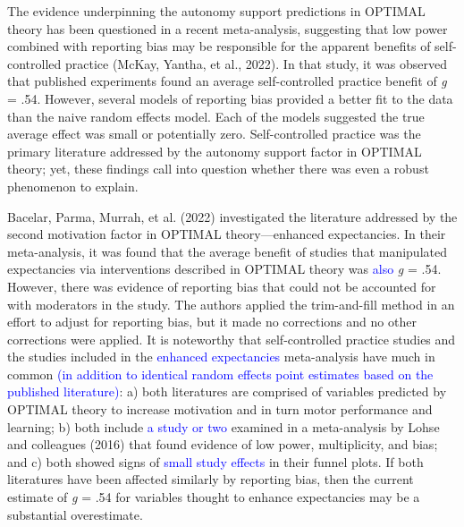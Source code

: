 \documentclass[
  man, donotrepeattitle,mask,floatsintext]{apa7}
\begin{document}
The evidence underpinning the autonomy support predictions in OPTIMAL theory has been questioned in a recent meta-analysis, suggesting that low power combined with reporting bias may be responsible for the apparent benefits of self-controlled practice (McKay, Yantha, et al., 2022). In that study, it was observed that published experiments found an average self-controlled practice benefit of \emph{g} = .54. However, several models of reporting bias provided a better fit to the data than the naive random effects model. Each of the models suggested the true average effect was small or potentially zero. Self-controlled practice was the primary literature addressed by the autonomy support factor in OPTIMAL theory; yet, these findings call into question whether there was even a robust phenomenon to explain.

Bacelar, Parma, Murrah, et al. (2022) investigated the literature addressed by the second motivation factor in OPTIMAL theory---enhanced expectancies. In their meta-analysis, it was found that the average benefit of studies that manipulated expectancies via interventions described in OPTIMAL theory was \textcolor{blue}{also} \emph{g} = .54. However, there was evidence of reporting bias that could not be accounted for with moderators in the study. The authors applied the trim-and-fill method in an effort to adjust for reporting bias, but it made no corrections and no other corrections were applied. It is noteworthy that self-controlled practice studies and the studies included in the \textcolor{blue}{enhanced expectancies} meta-analysis have much in common \textcolor{blue}{(in addition to identical random effects point estimates based on the published literature)}: a) both literatures are comprised of variables predicted by OPTIMAL theory to increase motivation and in turn motor performance and learning; b) both include \textcolor{blue}{a study or two} examined in a meta-analysis by Lohse and colleagues (2016) that found evidence of low power, multiplicity, and bias; and c) both showed signs of \textcolor{blue}{small study effects} in their funnel plots. If both literatures have been affected similarly by reporting bias, then the current estimate of \emph{g} = .54 for variables thought to enhance expectancies may be a substantial overestimate.
\end{document}
